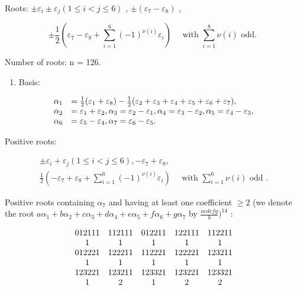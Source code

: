 Roots: \(\pm \varepsilon_{i} \pm \varepsilon_{j} (1 \leqslant i < j \leqslant 6)\) , \(\pm (\varepsilon_{7} - \varepsilon_{8})\) ,

\[
\pm \frac {1}{2} (\varepsilon_ {7} - \varepsilon_ {8} + \sum_ {i = 1} ^ {6} (- 1) ^ {\nu (i)} \varepsilon_ {i}) \quad \text { with } \sum_ {i = 1} ^ {8} \nu (i) \text { odd. }
\]

Number of roots: n = 126.

\begin{enumerate}
\def\labelenumi{(\Roman{enumi})}
\setcounter{enumi}{1}
\tightlist
\item
  Basis:
\end{enumerate}

\[
\begin{array}{r l} \alpha_ {1} & = \frac {1}{2} (\varepsilon_ {1} + \varepsilon_ {8}) - \frac {1}{2} (\varepsilon_ {2} + \varepsilon_ {3} + \varepsilon_ {4} + \varepsilon_ {5} + \varepsilon_ {6} + \varepsilon_ {7}), \\ \alpha_ {2} & = \varepsilon_ {1} + \varepsilon_ {2}, \alpha_ {3} = \varepsilon_ {2} - \varepsilon_ {1}, \alpha_ {4} = \varepsilon_ {3} - \varepsilon_ {2}, \alpha_ {5} = \varepsilon_ {4} - \varepsilon_ {3}, \\ \alpha_ {6} & = \varepsilon_ {5} - \varepsilon_ {4}, \alpha_ {7} = \varepsilon_ {6} - \varepsilon_ {5}. \end{array}
\]

Positive roots:

\[
\begin{array}{c} \pm \varepsilon_ {i} + \varepsilon_ {j} (1 \leqslant i <   j \leqslant 6), - \varepsilon_ {7} + \varepsilon_ {8}, \\ \frac {1}{2} (- \varepsilon_ {7} + \varepsilon_ {8} + \sum_ {i = 1} ^ {6} (- 1) ^ {\nu (i)} \varepsilon_ {i}) \quad \text { with } \sum_ {i = 1} ^ {6} \nu (i) \text { odd }. \end{array}
\]

Positive roots containing \(\alpha_{7}\) and having at least one coefficient \(\geqslant 2\) (we denote the root \(a\alpha_{1} + b\alpha_{2} + c\alpha_{3} + d\alpha_{4} + e\alpha_{5} + f\alpha_{6} + g\alpha_{7}\) by \(\frac{a c d e f g}{b})^{14}\) :

\[
\begin{array}{c c c c c} 0   1   2   1   1   1 & 1   1   2   1   1   1 & 0   1   2   2   1   1 & 1   2   2   1   1   1 & 1   1   2   2   1   1 \\ 1 & 1 & 1 & 1 & 1 \\ 0   1   2   2   2   1 & 1   2   2   2   1   1 & 1   1   2   2   2   1 & 1   2   2   2   2   1 & 1   2   3   2   1   1 \\ 1 & 1 & 1 & 1 & 1 \\ 1   2   3   2   2   1 & 1   2   3   2   1   1 & 1   2   3   3   2   1 & 1   2   3   2   2   1 & 1   2   3   3   2   1 \\ 1 & 2 & 1 & 2 & 2 \end{array}
\]

